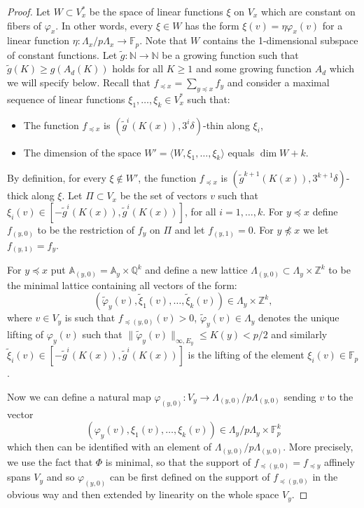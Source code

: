 \documentclass{daj}
\renewcommand{\le}{\leqslant}
\renewcommand{\ge}{\geqslant}
\newcommand{\Q}{\mathbb Q}
\newcommand{\Z}{\mathbb Z}
\newcommand{\A}{\mathbb A}
\newcommand{\N}{\mathbb N}
\newcommand{\FF}{\mathbb F}
\theoremstyle{definition}
\theoremstyle{remark}
\theoremstyle{definition}
\theoremstyle{definition}
\begin{document}
\begin{proof}
Let $W \subset V^*_x$ be the space of linear functions $\xi$ on $V_x$ which are constant on fibers of $\varphi_x$. In other words, every $\xi \in W$ has the form $\xi(v) = \eta\varphi_x(v)$ for a linear function $\eta: \Lambda_x/p\Lambda_x \rightarrow \FF_p$. Note that $W$ contains the 1-dimensional subspace of constant functions. 
Let $\tilde g: \N\to \N$ be a growing function such that $\tilde g(K) \ge g(A_d(K))$ holds for all $K\ge 1$ and some growing function $A_d$ which we will specify below. 
Recall that $f_{\preceq x} = \sum_{y\preceq x} f_y$ and consider a maximal sequence of linear functions $\xi_1, \ldots, \xi_k \in V_x^*$ such that:
\begin{itemize}
    \item The function $f_{\preceq x}$ is $(\tilde g^i(K(x)), 3^i\delta)$-thin along $\xi_i$,
    \item The dimension of the space $W' = \langle W, \xi_1,\ldots, \xi_k \rangle$ equals $\dim W + k$.
\end{itemize}
By definition, for every $\xi \not \in W'$, the function $f_{\preceq x}$ is $(\tilde g^{k+1}(K(x)), 3^{k+1}\delta)$-thick along $\xi$. Let $\Pi \subset V_x$ be the set of vectors $v$ such that $\xi_i(v) \in [-\tilde g^i(K(x)), \tilde g^i(K(x))]$, for all $i=1, \ldots, k$. For $y \preceq x$ define $f_{(y, 0)}$ to be the restriction of $f_y$ on $\Pi$ and let $f_{(y, 1)} = 0$. For $y\not \preceq x$ we let $f_{(y, 1)} = f_y$.


For $y \preceq x$ put $\A_{(y, 0)} = \A_y \times \Q^k$ and define a new lattice $\Lambda_{(y, 0)} \subset \Lambda_y \times \Z^k$ to be the minimal lattice containing all vectors of the form:
$$
(\tilde \varphi_y(v), \tilde \xi_1(v), \ldots, \tilde \xi_k(v)) \in \Lambda_y \times \Z^k,
$$
where $v \in V_y$ is such that $f_{\preceq (y, 0)}(v) > 0$, $\tilde \varphi_y(v) \in \Lambda_y$ denotes the unique lifting of $\varphi_y(v)$ such that $\| \tilde \varphi_y(v) \|_{\infty, E_y} \le K(y) < p/2$ and similarly $\tilde \xi_i(v) \in [-\tilde g^i(K(x)), \tilde g^i(K(x))]$ is the lifting of the element $\xi_i(v) \in \FF_p$. 

Now we can define a natural map $\varphi_{(y, 0)}: V_{y} \rightarrow \Lambda_{(y, 0)}/p\Lambda_{(y,0)}$ sending $v$ to the vector 
$$
(\varphi_y(v), \xi_1(v), \ldots, \xi_k(v)) \in \Lambda_y/p\Lambda_y \times \FF_p^k
$$ 
which then can be identified with an element of $\Lambda_{(y, 0)}/p\Lambda_{(y,0)}$. More precisely, we use the fact that $\Phi$ is minimal, so that the support of $f_{\preceq (y,0)} = f_{\preceq y}$ affinely spans $V_y$ and so $\varphi_{(y, 0)}$ can be first defined on the support of $f_{\preceq (y, 0)}$ in the obvious way and then extended by linearity on the whole space $V_y$.


\end{proof}
\end{document}
